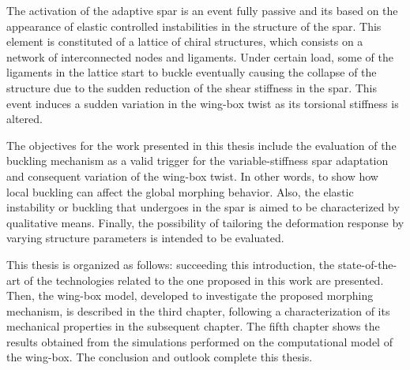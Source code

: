 The activation of the adaptive spar is an event fully passive and its based on the appearance of elastic controlled instabilities in the structure of the spar. This element is constituted of a lattice of chiral structures, which consists on a network of interconnected nodes and ligaments. Under certain load, some of the ligaments in the lattice start to buckle eventually causing the collapse of the structure due to the sudden reduction of the shear stiffness in the spar. This event induces a sudden variation in the wing-box twist as its torsional stiffness is altered.

The objectives for the work presented in this thesis include the evaluation of the buckling mechanism as a valid trigger for the variable-stiffness spar adaptation and consequent variation of the wing-box twist. In other words, to show how local buckling can affect the global morphing behavior. Also, the elastic instability or buckling that undergoes in the spar is aimed to be characterized by qualitative means. Finally, the possibility of tailoring the deformation response by varying structure parameters is intended to be evaluated. 

This thesis is organized as follows: succeeding this introduction, the state-of-the-art of the technologies related to the one proposed in this work are presented. Then, the wing-box model, developed to investigate the proposed morphing mechanism, is described in the third chapter, following a characterization of its mechanical properties in the subsequent chapter. The fifth chapter shows the results obtained from the simulations performed on the computational model of the wing-box. The conclusion and outlook complete this thesis.